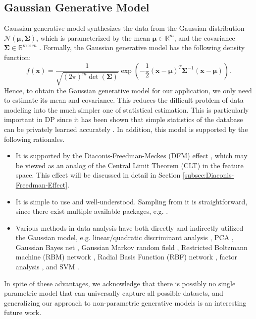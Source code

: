 \documentclass[USenglish,oneside,twocolumn]{article}
\theoremstyle{definition}
\theoremstyle{remark}
\theoremstyle{plain}
\theoremstyle{plain}
\begin{document}
\vspace{-2em}
\subsection{Gaussian Generative Model}\label{subsec:gaussian_model}
Gaussian generative model synthesizes
the data from the Gaussian distribution $\mathcal{N}(\boldsymbol{\mu},\boldsymbol{\Sigma})$,
which is parameterized by the mean $\boldsymbol{\mu}\in\mathbb{R}^{m}$,
and the covariance $\boldsymbol{\Sigma}\in\mathbb{R}^{m\times m}$
\cite{RefWorks:51,RefWorks:475}. Formally, the Gaussian generative
model has the following density function: 
\begin{equation}
f(\mathbf{x})=\frac{1}{\sqrt{(2\pi)^{m}\det(\boldsymbol{\Sigma})}}\exp(-\frac{1}{2}(\mathbf{x}-\boldsymbol{\mu})^{T}\boldsymbol{\Sigma}^{-1}(\mathbf{x}-\boldsymbol{\mu})).\label{eq:guassian_pdf}
\end{equation}
Hence, to obtain the Gaussian generative model for our application,
we only need to estimate its mean and covariance. This
reduces the difficult problem of data modeling into the much simpler
one of statistical estimation. This is particularly important in DP
since it has been shown that simple statistics of the database
can be privately learned accurately \cite{RefWorks:477,RefWorks:478}.
In addition, this model is supported by the following rationales.
\begin{itemize}
\item It is supported by the Diaconis-Freedman-Meckes (DFM) effect \cite{RefWorks:439},
which may be viewed as an analog of the Central Limit Theorem (CLT)
\cite{RefWorks:342,RefWorks:343} in the feature space. This effect
will be discussed in detail in Section \ref{subsec:Diaconis-Freedman-Effect}.
\item It is simple to use and well-understood. Sampling from it is straightforward,
since there exist multiple available packages, e.g. \cite{RefWorks:227,RefWorks:228,RefWorks:229}. 

\item Various methods in data analysis have both directly and indirectly
utilized the Gaussian model, e.g. linear/quadratic discriminant analysis
\cite{RefWorks:292,RefWorks:482}, PCA \cite{RefWorks:442}\cite[chapter 12]{RefWorks:51},
Gaussian Bayes net \cite[chapter 10]{RefWorks:51}, Gaussian Markov
random field \cite{RefWorks:484}, Restricted Boltzmann machine (RBM)
network \cite{RefWorks:484}, Radial Basis Function (RBF) network
\cite{RefWorks:486}, factor analysis \cite[chapter 12]{RefWorks:51},
and SVM \cite{RefWorks:483}.
\end{itemize}
In spite of these advantages, we acknowledge that there is possibly
no single parametric model that can universally capture all possible
datasets, and generalizing our approach to non-parametric generative
models is an interesting future work.
\end{document}
